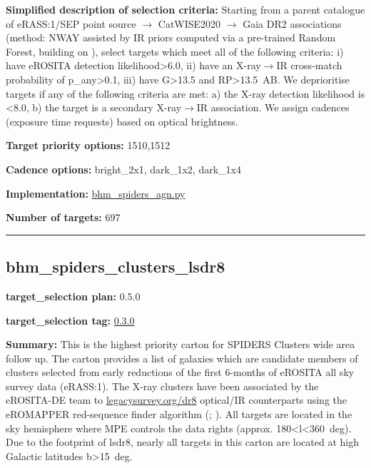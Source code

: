 \noindent\textbf{Simplified description of selection criteria:} Starting from a
parent catalogue of eRASS:1/SEP point source $\rightarrow$ CatWISE2020 $\rightarrow$ Gaia DR2
associations (method: NWAY assisted by IR priors computed via a
pre-trained Random Forest, building on
\citealt{Salvato2022}), select targets which meet all of the following criteria:
i) have eROSITA detection likelihood\textgreater{}6.0, ii) have an
X-ray$\rightarrow$IR cross-match probability of p\_any\textgreater{}0.1, iii) have
G\textgreater{}13.5 and RP\textgreater{}13.5~AB. We deprioritise targets
if any of the following criteria are met: a) the X-ray detection
likelihood is \textless{}8.0, b) the target is a secondary X-ray$\rightarrow$IR
association. We assign cadences (exposure time requests) based on
optical brightness.


\noindent\textbf{Target priority options:} 1510,1512

\noindent\textbf{Cadence options:} bright\_2x1, dark\_1x2, dark\_1x4

\noindent\textbf{Implementation:}
\href{https://github.com/sdss/target_selection/blob/0.3.0/python/target_selection/cartons/bhm_spiders_agn.py}{bhm\_spiders\_agn.py}

\noindent\textbf{Number of targets:} 697

\begin{center}\rule{0.5\linewidth}{0.5pt}\end{center}

\hypertarget{bhm_spiders_clusters_lsdr8_plan0.5.0}{%
\subsection{bhm\_spiders\_clusters\_lsdr8}\label{bhm_spiders_clusters_lsdr8_plan0.5.0}}

\noindent\textbf{target\_selection plan:} 0.5.0

\noindent\textbf{target\_selection tag:}
\href{https://github.com/sdss/target_selection/tree/0.3.0/}{0.3.0}

\noindent\textbf{Summary:} This is the highest priority carton for SPIDERS
Clusters wide area follow up. The carton provides a list of galaxies
which are candidate members of clusters selected from early reductions
of the first 6-months of eROSITA all sky survey data (eRASS:1). The
X-ray clusters have been associated by the eROSITA-DE team to
\href{https://www.legacysurvey.org/dr8/}{legacysurvey.org/dr8}
optical/IR counterparts using the eROMAPPER red-sequence finder
algorithm
(\citealt{Rykoff2014};
\citealt{IderChitham2020}). All targets are located in the sky hemisphere
where MPE controls the data rights (approx.
180\textless{}l\textless{}360~deg). Due to the footprint of lsdr8,
nearly all targets in this carton are located at high Galactic latitudes
\textbar{}b\textbar{}\textgreater{}15~deg.


